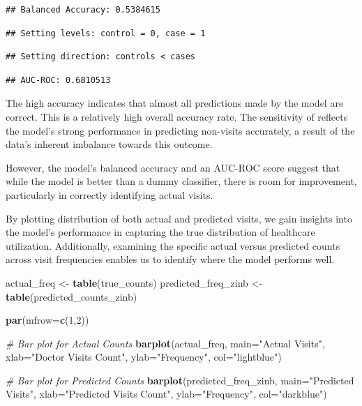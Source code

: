 \documentclass[
]{article}
\newenvironment{Shaded}{\begin{snugshade}}{\end{snugshade}}
\newcommand{\AttributeTok}[1]{\textcolor[rgb]{0.13,0.29,0.53}{#1}}
\newcommand{\CommentTok}[1]{\textcolor[rgb]{0.56,0.35,0.01}{\textit{#1}}}
\newcommand{\DecValTok}[1]{\textcolor[rgb]{0.00,0.00,0.81}{#1}}
\newcommand{\FunctionTok}[1]{\textcolor[rgb]{0.13,0.29,0.53}{\textbf{#1}}}
\newcommand{\NormalTok}[1]{#1}
\newcommand{\OtherTok}[1]{\textcolor[rgb]{0.56,0.35,0.01}{#1}}
\newcommand{\StringTok}[1]{\textcolor[rgb]{0.31,0.60,0.02}{#1}}
\begin{document}
\begin{verbatim}
## Balanced Accuracy: 0.5384615
\end{verbatim}

\begin{verbatim}
## Setting levels: control = 0, case = 1
\end{verbatim}

\begin{verbatim}
## Setting direction: controls < cases
\end{verbatim}

\begin{verbatim}
## AUC-ROC: 0.6810513
\end{verbatim}

The high accuracy indicates that almost all predictions made by the
model are correct. This is a relatively high overall accuracy rate. The
sensitivity of reflects the model's strong performance in predicting
non-visits accurately, a result of the data's inherent imbalance towards
this outcome.

However, the model's balanced accuracy and an AUC-ROC score suggest that
while the model is better than a dummy classifier, there is room for
improvement, particularly in correctly identifying actual visits.

By plotting distribution of both actual and predicted visits, we gain
insights into the model's performance in capturing the true distribution
of healthcare utilization. Additionally, examining the specific actual
versus predicted counts across visit frequencies enables us to identify
where the model performs well.

\begin{Shaded}
\begin{Highlighting}[]
\NormalTok{actual\_freq }\OtherTok{\textless{}{-}} \FunctionTok{table}\NormalTok{(true\_counts)}
\NormalTok{predicted\_freq\_zinb }\OtherTok{\textless{}{-}} \FunctionTok{table}\NormalTok{(predicted\_counts\_zinb)}

\FunctionTok{par}\NormalTok{(}\AttributeTok{mfrow=}\FunctionTok{c}\NormalTok{(}\DecValTok{1}\NormalTok{,}\DecValTok{2}\NormalTok{))}

\CommentTok{\# Bar plot for Actual Counts}
\FunctionTok{barplot}\NormalTok{(actual\_freq, }\AttributeTok{main=}\StringTok{"Actual Visits"}\NormalTok{, }\AttributeTok{xlab=}\StringTok{"Doctor Visits Count"}\NormalTok{,}
        \AttributeTok{ylab=}\StringTok{"Frequency"}\NormalTok{, }\AttributeTok{col=}\StringTok{"lightblue"}\NormalTok{)}

\CommentTok{\# Bar plot for Predicted Counts}
\FunctionTok{barplot}\NormalTok{(predicted\_freq\_zinb, }\AttributeTok{main=}\StringTok{"Predicted Visits"}\NormalTok{, }\AttributeTok{xlab=}\StringTok{"Predicted Visits Count"}\NormalTok{,}
        \AttributeTok{ylab=}\StringTok{"Frequency"}\NormalTok{, }\AttributeTok{col=}\StringTok{"darkblue"}\NormalTok{)}
\end{Highlighting}
\end{Shaded}
\end{document}
